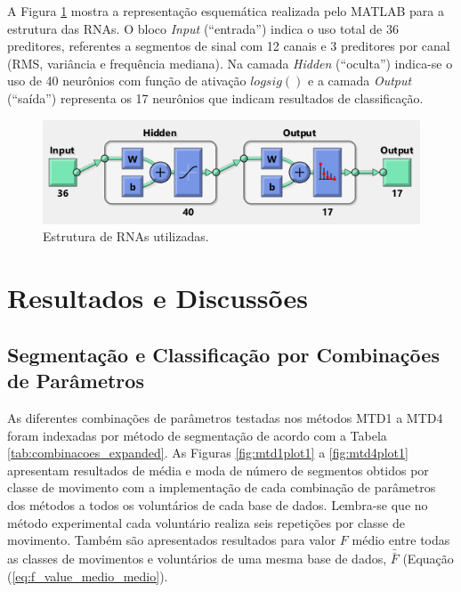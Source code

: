 A Figura \ref{fig:matlabRNA} mostra a representação esquemática realizada pelo MATLAB para a estrutura das RNAs. O bloco \emph{Input} (``entrada'') indica o uso total de 36 preditores, referentes a segmentos de sinal com 12 canais e 3 preditores por canal (RMS, variância e frequência mediana). Na camada \emph{Hidden} (``oculta'') indica-se o uso de 40 neurônios com função de ativação $logsig()$ e a camada \emph{Output} (``saída'') representa os 17 neurônios que indicam resultados de classificação.

\begin{figure}[htb]
	\caption{\label{fig:matlabRNA}Estrutura de RNAs utilizadas.}
	\begin{center}
	    \includegraphics[width=0.75\linewidth]{./img/matlabRNA.png}
	\end{center}
\end{figure}


	\chapter{Resultados e Discussões}
		\section{Segmentação e Classificação por Combinações de Parâmetros}
As diferentes combinações de parâmetros testadas nos métodos MTD1 a MTD4 foram indexadas por método de segmentação de acordo com a Tabela \ref{tab:combinacoes_expanded}. As Figuras \ref{fig:mtd1plot1} a \ref{fig:mtd4plot1} apresentam resultados de média e moda de número de segmentos obtidos por classe de movimento com a implementação de cada combinação de parâmetros dos métodos a todos os voluntários de cada base de dados. Lembra-se que no método experimental cada voluntário realiza seis repetições por classe de movimento. Também são apresentados resultados para valor $F$ médio entre todas as classes de movimentos e voluntários de uma mesma base de dados, $\bar{\bar{F}}$ (Equação (\ref{eq:f_value_medio_medio}).

